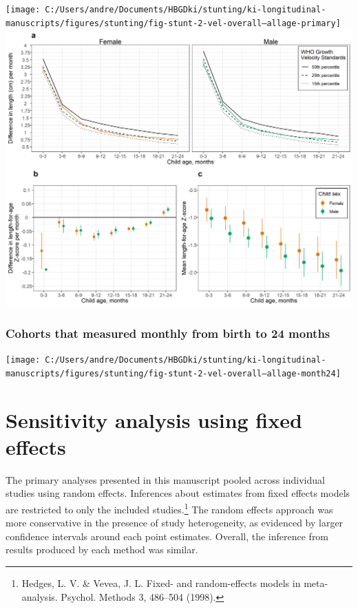 \documentclass[
  9pt,
]{book}
\begin{document}
\texttt{[image: C:/Users/andre/Documents/HBGDki/stunting/ki-longitudinal-manuscripts/figures/stunting/fig-stunt-2-vel-overall--allage-primary]}
\includegraphics[width=41.67in]{figure-copies/fig-stunt-2-vel-overall--allage-primary}

\hypertarget{cohorts-that-measured-monthly-from-birth-to-24-months-3}{%
\subsection{Cohorts that measured monthly from birth to 24 months}\label{cohorts-that-measured-monthly-from-birth-to-24-months-3}}

\texttt{[image: C:/Users/andre/Documents/HBGDki/stunting/ki-longitudinal-manuscripts/figures/stunting/fig-stunt-2-vel-overall--allage-month24]}

\hypertarget{fixed-effects}{%
\chapter{Sensitivity analysis using fixed effects}\label{fixed-effects}}

The primary analyses presented in this manuscript pooled across individual studies using random effects. Inferences about estimates from fixed effects models are restricted to only the included studies.\footnote{Hedges, L. V. \& Vevea, J. L. Fixed- and random-effects models in meta-analysis. Psychol. Methods 3, 486--504 (1998).} The random effects approach was more conservative in the presence of study heterogeneity, as evidenced by larger confidence intervals around each point estimates. Overall, the inference from results produced by each method was similar.
\end{document}
